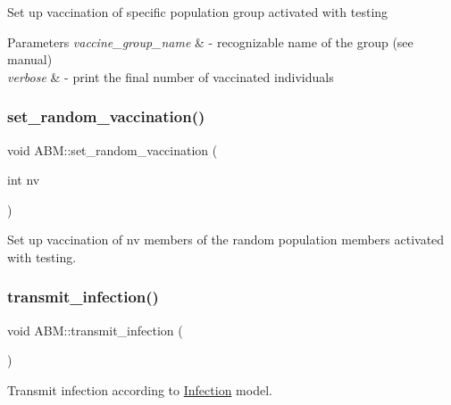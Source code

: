 Set up vaccination of specific population group activated with testing 
\begin{DoxyParams}{Parameters}
{\em vaccine\+\_\+group\+\_\+name} & -\/ recognizable name of the group (see manual) \\
\hline
{\em verbose} & -\/ print the final number of vaccinated individuals \\
\hline
\end{DoxyParams}
\mbox{\label{classABM_af80a8ff3dbbd2e64693c127702c0b64e}} 
\subsubsection{\texorpdfstring{set\+\_\+random\+\_\+vaccination()}{set\_random\_vaccination()}}
{\footnotesize\ttfamily void A\+B\+M\+::set\+\_\+random\+\_\+vaccination (\begin{DoxyParamCaption}\item[{int}]{nv }\end{DoxyParamCaption})\hspace{0.3cm}{\ttfamily [inline]}}



Set up vaccination of nv members of the random population members activated with testing. 

\mbox{\label{classABM_a532b704843314423cc3ffc4e2ed66f1a}} 
\subsubsection{\texorpdfstring{transmit\+\_\+infection()}{transmit\_infection()}}
{\footnotesize\ttfamily void A\+B\+M\+::transmit\+\_\+infection (\begin{DoxyParamCaption}{ }\end{DoxyParamCaption})}



Transmit infection according to \hyperlink{classInfection}{Infection} model. 

\mbox{\label{classABM_a58d45195b1ab07fadd7f4a23adc8b18a}} 
